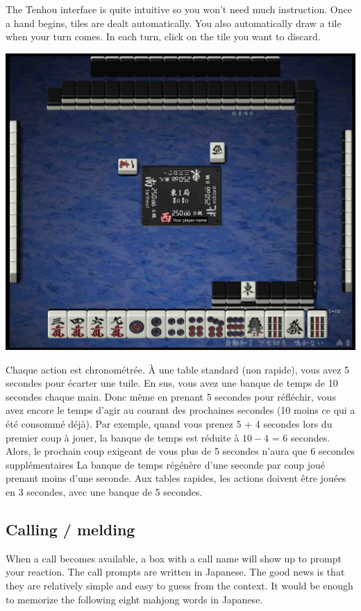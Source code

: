 \bigskip
The {\jap Tenhou} interface is quite intuitive so you won't need much instruction. 
Once a hand begins, tiles are dealt automatically. You also automatically draw a tile when your turn comes. 
In each turn, click on the tile you want to discard. 

\begin{center}
\includegraphics[width=.6\textwidth,clip]{figs/interface.jpg}
\end{center}
\vspace{-25pt}

\bigskip
Chaque action est chronométrée. À une table standard (non rapide), vous avez 5 secondes pour écarter une tuile. En sus, vous avez une banque de temps de 10 secondes chaque main. Donc même en prenant 5 secondes pour réfléchir, vous avez encore le temps d’agir au courant des prochaines secondes (10 moins ce qui a été consommé déjà). Par exemple, quand vous prenez 5 + 4 secondes lors du premier coup à jouer, la banque de temps est réduite à $10 - 4$ = 6 secondes. Alors, le prochain coup exigeant de vous plus de 5 secondes n’aura que 6 secondes supplémentaires  La banque de temps régénère d’une seconde par coup joué prenant moins d’une seconde. Aux tables rapides, les actions doivent être jouées en 3 secondes, avec une banque de 5 secondes.

\subsection{Calling / melding}
When a call becomes available, a box with a call name will show up to prompt your reaction. 
The call prompts are written in Japanese. The good news is that they are relatively simple and easy to guess from the context. It would be enough to memorize the following eight mahjong words in Japanese. 

